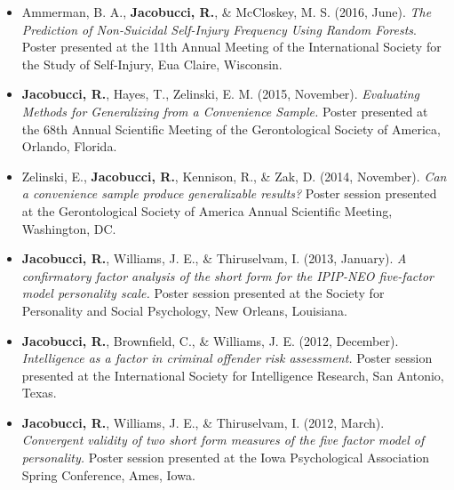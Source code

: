 \documentclass[letterpaper,10pt]{article}
\begin{document}
\begin{itemize}
\item[]Ammerman, B. A., \textbf{Jacobucci, R.}, \& McCloskey, M. S. (2016, June). \textit{The Prediction of Non-Suicidal Self-Injury Frequency Using Random Forests}. Poster presented at the 11th Annual Meeting of the International Society for the Study of Self-Injury, Eua Claire, Wisconsin.
%
\item[] \textbf{Jacobucci, R.}, Hayes, T., Zelinski, E. M. (2015, November). \emph{Evaluating Methods for Generalizing from a Convenience Sample.} Poster presented at the 68th Annual Scientific Meeting of the Gerontological Society of America, Orlando, Florida.
%
\item[]Zelinski, E., \textbf{Jacobucci, R.}, Kennison, R., \& Zak, D. (2014, November). \emph{Can a convenience sample produce generalizable results?} Poster session presented at the Gerontological Society of America Annual Scientific Meeting, Washington, DC.
%
\item[]\textbf{Jacobucci, R.}, Williams, J. E., \& Thiruselvam, I. (2013, January). \emph{A confirmatory factor analysis of the short form for the IPIP-NEO five-factor model personality scale.} Poster session presented at the Society for Personality and Social Psychology, New Orleans, Louisiana.
%
\item[]\textbf{Jacobucci, R.}, Brownfield, C., \& Williams, J. E. (2012, December). \emph{Intelligence as a factor in criminal offender risk assessment.} Poster session presented at the International Society for Intelligence Research, San Antonio, Texas.
%
\item []\textbf{Jacobucci, R.}, Williams, J. E., \& Thiruselvam, I. (2012, March). \emph{Convergent validity of two short form measures of the five factor model of personality.} Poster session presented at the Iowa Psychological Association Spring Conference, Ames, Iowa.
 
\end{itemize}
\end{document}
